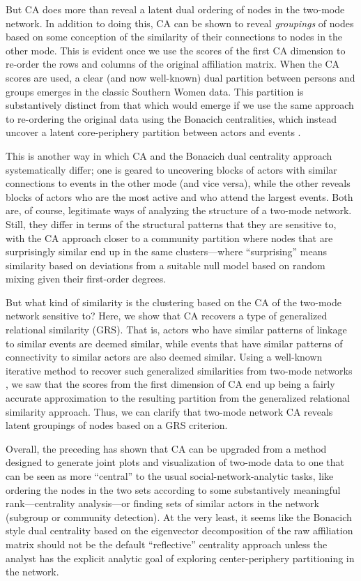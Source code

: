 \documentclass[a4paper,fleqn]{cas-sc}
\begin{document}
But CA does more than reveal a latent dual ordering of nodes in the two-mode network. In addition to doing this, CA can be shown to reveal \textit{groupings} of nodes based on some conception of the similarity of their connections to nodes in the other mode. This is evident once we use the scores of the first CA dimension to re-order the rows and columns of the original affiliation matrix. When the CA scores are used, a clear (and now well-known) dual partition between persons and groups emerges in the classic Southern Women data. This partition is substantively distinct from that which would emerge if we use the same approach to re-ordering the original data using the Bonacich centralities, which instead uncover a latent core-periphery partition between actors and events \citep{everett2013dual}. 

This is another way in which CA and the Bonacich dual centrality approach systematically differ; one is geared to uncovering blocks of actors with similar connections to events in the other mode (and vice versa), while the other reveals blocks of actors who are the most active and who attend the largest events. Both are, of course, legitimate ways of analyzing the structure of a two-mode network. Still, they differ in terms of the structural patterns that they are sensitive to, with the CA approach closer to a community partition where nodes that are surprisingly similar end up in the same clusters---where ``surprising'' means similarity based on deviations from a suitable null model based on random mixing given their first-order degrees. 

But what kind of similarity is the clustering based on the CA of the two-mode network sensitive to? Here, we show that CA recovers a type of generalized relational similarity (GRS). That is, actors who have similar patterns of linkage to similar events are deemed similar, while events that have similar patterns of connectivity to similar actors are also deemed similar. Using a well-known iterative method to recover such generalized similarities from two-mode networks \citep{jeh2002simrank}, we saw that the scores from the first dimension of CA end up being a fairly accurate approximation to the resulting partition from the generalized relational similarity approach. Thus, we can clarify that two-mode network CA reveals latent groupings of nodes based on a GRS criterion. 

Overall, the preceding has shown that CA can be upgraded from a method designed to generate joint plots and visualization of two-mode data to one that can be seen as more ``central'' to the usual social-network-analytic tasks, like ordering the nodes in the two sets according to some substantively meaningful rank---centrality analysis---or finding sets of similar actors in the network (subgroup or community detection). At the very least, it seems like the Bonacich style dual centrality based on the eigenvector decomposition of the raw affiliation matrix should not be the default ``reflective'' centrality approach unless the analyst has the explicit analytic goal of exploring center-periphery partitioning in the network. 
\end{document}
